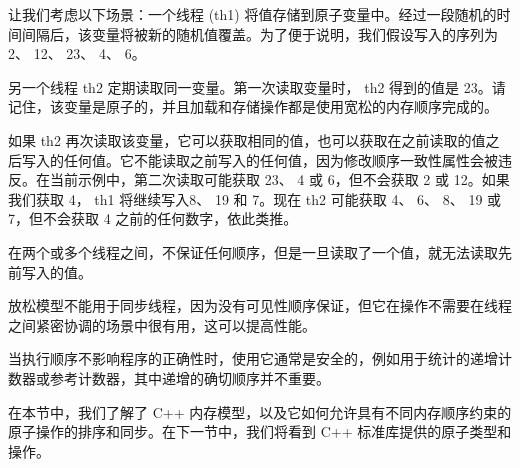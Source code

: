 让我们考虑以下场景：一个线程 (th1) 将值存储到原子变量中。经过一段随机的时间间隔后，该变量将被新的随机值覆盖。为了便于说明，我们假设写入的序列为 2、 12、 23、 4、 6。

另一个线程 th2 定期读取同一变量。第一次读取变量时， th2 得到的值是 23。请记住，该变量是原子的，并且加载和存储操作都是使用宽松的内存顺序完成的。

如果 th2 再次读取该变量，它可以获取相同的值，也可以获取在之前读取的值之后写入的任何值。它不能读取之前写入的任何值，因为修改顺序一致性属性会被违反。在当前示例中，第二次读取可能获取 23、 4 或 6，但不会获取 2 或 12。如果我们获取 4， th1 将继续写入8、 19 和 7。现在 th2 可能获取 4、 6、 8、 19 或 7，但不会获取 4 之前的任何数字，依此类推。

在两个或多个线程之间，不保证任何顺序，但是一旦读取了一个值，就无法读取先前写入的值。

放松模型不能用于同步线程，因为没有可见性顺序保证，但它在操作不需要在线程之间紧密协调的场景中很有用，这可以提高性能。

当执行顺序不影响程序的正确性时，使用它通常是安全的，例如用于统计的递增计数器或参考计数器，其中递增的确切顺序并不重要。

在本节中，我们了解了 C++ 内存模型，以及它如何允许具有不同内存顺序约束的原子操作的排序和同步。在下一节中，我们将看到 C++ 标准库提供的原子类型和操作。











































